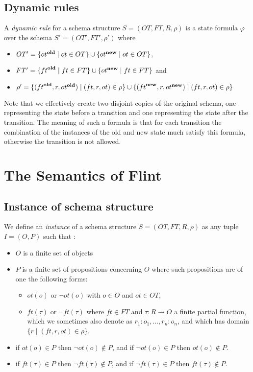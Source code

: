 \documentclass[11pt]{amsart}
\newcommand{\flint}{{\sc Flint}}
\newcommand{\old}[1]{{#1}^{\textrm{\textbf{old}}}}
\newcommand{\new}[1]{{#1}^{\textrm{\textbf{new}}}}
\begin{document}
\subsection{Dynamic rules}   A \emph{dynamic rule} for a schema structure $S = (OT, FT, R, \rho)$ is a state formula $\varphi$ over the schema $S' = (OT', FT', \rho')$ where
\begin{itemize}
  \item $OT' = \{ \old{ot} \mid ot \in OT \} \cup \{ \new{ot} \mid ot \in OT  \}$, 
  \item $FT' = \{ \old{ft} \mid ft \in FT \} \cup \{ \new{ot} \mid ft \in FT  \}$ and 
  \item $\rho' = \{ (\old{ft}, r, \old{ot}) \mid (ft, r, ot) \in \rho \} \cup \{ (\new{ft}, r, \new{ot}) \mid (ft, r, ot) \in \rho \}$ 
\end{itemize}
Note that we effectively create two disjoint copies of the original schema, one representing the state before a transition and one representing the state after the transition. The meaning of such a formula is that for each transition the combination of the instances of the old and new state much satisfy this formula, otherwise the transition is not allowed.


\section{The Semantics of \flint}


\subsection{Instance of schema structure} We define an \emph{instance} of a schema structure $S = (OT, FT, R, \rho)$ as any tuple $I = (O, P)$ such that :
\begin{itemize}
  \item $O$ is a finite set of objects
  \item $P$ is a finite set of propositions concerning $O$ where such propositions are of one the following forms:
    \begin{itemize}
      \item $ot(o)$ or $\neg{ot}(o)$ with $o \in O$ and $ot \in OT$,
      \item $ft(\tau)$ or $\neg{ft}(\tau)$ where $ft \in FT$ and $\tau : R \to O$ a finite partial function, which we sometimes also denote as $r_1 : o_1, \ldots, r_n : o_n$, and which has domain $\{ r \mid (ft, r, ot) \in \rho \}$. 
    \end{itemize} 
  \item if $ot(o) \in P$ then $\neg{ot}(o) \not\in P$, and  if $\neg{ot}(o) \in P$ then ${ot}(o) \not\in P$.
  \item if $ft(\tau) \in P$ then $\neg{ft}(\tau) \not\in P$, and if $\neg{ft}(\tau) \in P$ then ${ft}(\tau) \not\in P$.  
\end{itemize}
\end{document}
